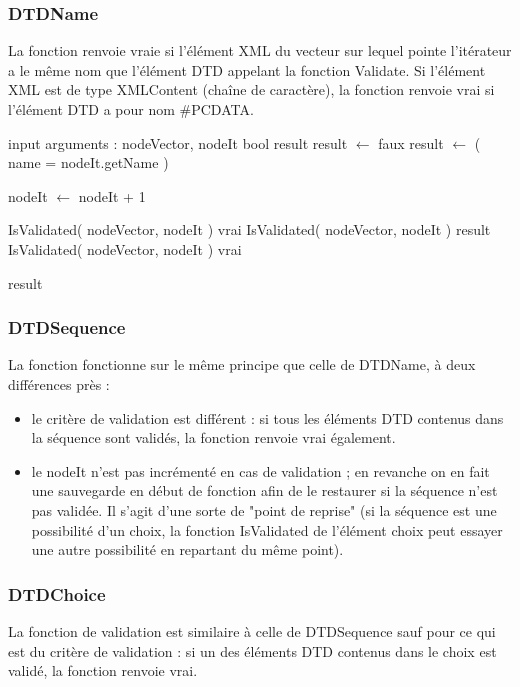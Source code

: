 \subsubsection{DTDName}

La fonction renvoie vraie si l'élément XML du vecteur sur lequel pointe
l'itérateur a le même nom que l'élément DTD appelant la fonction Validate.
Si l'élément XML est de type XMLContent (chaîne de caractère), la fonction
renvoie vrai si l'élément DTD a pour nom #PCDATA.

\begin{algorithmic}
\STATE input arguments : nodeVector, nodeIt
\STATE bool result
\STATE result $\gets$ faux
\ELSE
\STATE result $\gets$ ( name = nodeIt.getName )
\ENDIF

\STATE nodeIt $\gets$ nodeIt + 1
\ENDIF

    \STATE IsValidated( nodeVector, nodeIt )
    \ENDIF
    \RETURN vrai
    \STATE IsValidated( nodeVector, nodeIt )
    \ENDIF
    \RETURN result
    \STATE IsValidated( nodeVector, nodeIt )
    \ENDIF
    \RETURN vrai
\ENDIF

\RETURN result

\end{algorithmic}


\subsubsection{DTDSequence}

La fonction fonctionne sur le même principe que celle de DTDName, à deux
différences près : 
\begin{itemize}
\item le critère de validation est différent : si tous les éléments DTD
contenus dans la séquence sont validés, la fonction renvoie vrai également.
\item le nodeIt n'est pas incrémenté en cas de validation ; en revanche on
en fait une sauvegarde en début de fonction afin de le restaurer si la
séquence n'est pas validée. Il s'agit d'une sorte de "point de reprise" (si
la séquence est une possibilité d'un choix, la fonction IsValidated de
l'élément choix peut essayer une autre possibilité en repartant du même
point).
\end{itemize}

\subsubsection{DTDChoice}

La fonction de validation est similaire à celle de DTDSequence sauf pour ce
qui est du critère de validation : si un des éléments DTD contenus dans le choix est validé, la fonction
renvoie vrai.

